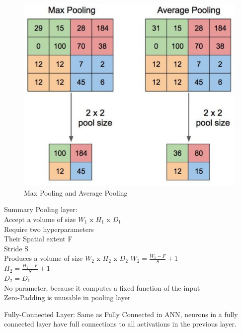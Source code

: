 \begin{center}
  \begin{figure}[H]
  \centering
  \includegraphics[width=1\columnwidth]{images/chap2/Pooling.png}
  \caption{Max Pooling and Average Pooling}
  \label{chap2:WSP}
  \end{figure}
\end{center}

Summary Pooling layer:\\
Accept a volume of size $W_{1}$ x $H_{1}$ x $D_{1}$\\
Require two hyperparameters\\
Their Spatial extent F \\
Stride S\\
Produces a volume of size $W_{2}$ x $H_{2}$ x $D_{2}$
$W_{2} = \frac{W_{1} - F }{S} + 1$\\
$H_{2} = \frac{H_{1} - F }{S} + 1$\\
$D_{2} = D_{1}$\\
No parameter, because it computes a fixed function of the input\\
Zero-Padding is unusable in pooling layer

Fully-Connected Layer:
Same as Fully Connected in ANN, neurons in a fully connected layer have full connections to all activations in the previous layer. 

